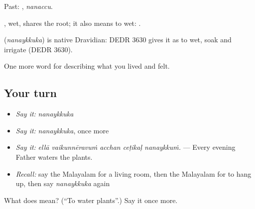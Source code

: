 Past: , \emph{nanaccu}.

, wet, shares the root; it also means to wet:  .

\begin{cousinweb}
\textbf{} (\emph{nanaykkuka}) is native Dravidian: DEDR 3630 gives it as to wet, soak and irrigate (DEDR 3630).
\end{cousinweb}

\begin{grammarlens}[title={What you've built}]
One more word for describing what you lived and felt.
\end{grammarlens}

\subsection*{Your turn}
\begin{itemize}
\raggedright
  \item \emph{Say it:} \emph{nanaykkuka}
  \item \emph{Say it:} \emph{nanaykkuka}, once more
  \item \emph{Say it:} \emph{ellā vaikunnēravuṁ acchan ceṭikaḷ nanaykkuṁ.} — Every evening Father waters the plants.
  \item \emph{Recall:} say the Malayalam for a living room, then the Malayalam for to hang up, then say \emph{nanaykkuka} again
\end{itemize}

\begin{tcolorbox}[breakable,colback=teal!4,colframe=teal!35!black,title={Before you move on}]
What does  mean? (\textquotedblleft{}To water plants\textquotedblright{}.) Say it once more.
\end{tcolorbox}
